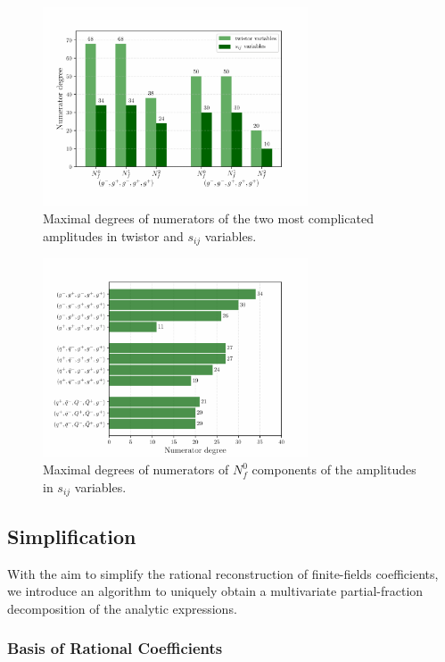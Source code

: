 \begin{figure}[ht]
  \centering
  \includegraphics[width = 0.7\textwidth]{plots/twistorXsijs_comparison.pdf}
  \caption{Maximal degrees of numerators of the two most complicated amplitudes in twistor and $s_{ij}$ variables.}
  \label{fig:degrees-twXsij}
\end{figure}

\begin{figure}[ht]
  \centering
  \includegraphics[width = 0.7\textwidth]{plots/plot_sijs.pdf}
  \caption{Maximal degrees of numerators of $N_f^0$ components of the amplitudes in $s_{ij}$ variables.}
  \label{fig:degrees-all}
\end{figure}


\subsection{Simplification}
%
With the aim to simplify the rational reconstruction of finite-fields coefficients, we
introduce an algorithm to uniquely obtain a multivariate partial-fraction decomposition of the analytic expressions.

\subsubsection{Basis of Rational Coefficients}

